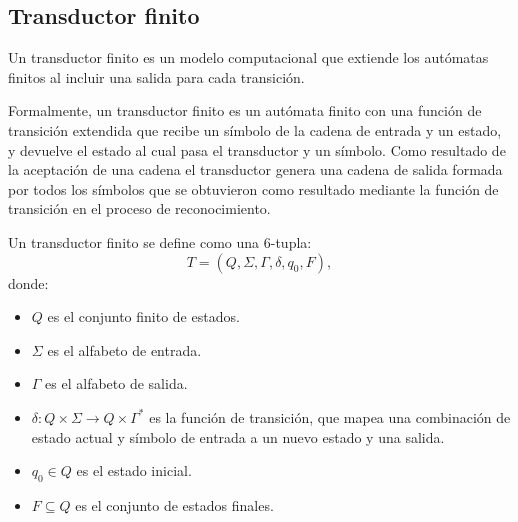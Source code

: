 \subsection{Transductor finito}

Un transductor finito \cite{finite_transducer} es un modelo computacional que extiende 
los autómatas finitos al incluir una salida para cada transición.  

Formalmente, un transductor finito es un autómata finito con una función de transición extendida que recibe 
un símbolo de la cadena de entrada y un estado, y devuelve el estado al cual pasa el transductor y un símbolo. 
Como resultado de la aceptación de una cadena el transductor genera una cadena de salida formada por todos los 
símbolos que se obtuvieron como resultado mediante la función de transición en el proceso de reconocimiento.

Un transductor finito se define como una 6-tupla:
\[
  T = (Q, \Sigma, \Gamma, \delta, q_0, F),
\]
donde:
\begin{itemize}
  \item \(Q\) es el conjunto finito de estados.
  \item \(\Sigma\) es el alfabeto de entrada.
  \item \(\Gamma\) es el alfabeto de salida.
  \item \(\delta: Q \times \Sigma \to Q \times \Gamma^*\) es la función de transición, que mapea una combinación de estado actual y símbolo de entrada a un nuevo estado y una salida.
  \item \(q_0 \in Q\) es el estado inicial.
  \item \(F \subseteq Q\) es el conjunto de estados finales.
\end{itemize}

